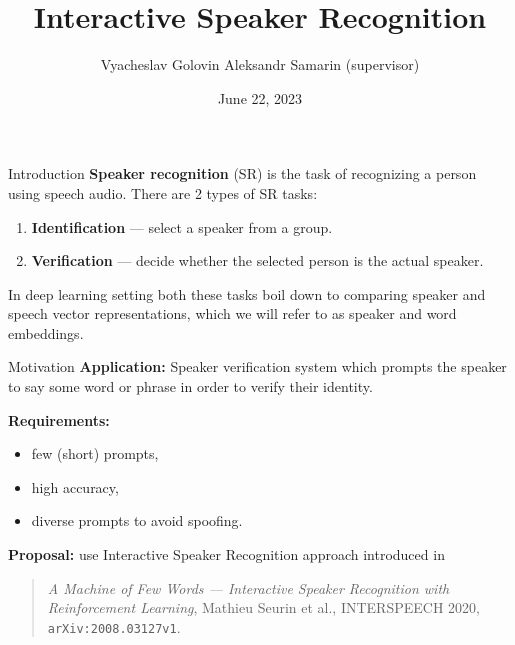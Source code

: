 \documentclass[11pt, aspectratio=169]{beamer}
\title{Interactive Speaker Recognition}
\author{Vyacheslav Golovin \texorpdfstring{\newline}{, }
    {\small Aleksandr Samarin (supervisor)}}
\institute[HSE]{Huawei CBG AI and HSE University}
\date{June 22, 2023}
\begin{document}
\maketitle

\begin{frame}{Introduction}
    \textbf{Speaker recognition} (SR) is the task of recognizing a person using
    speech audio. There are 2 types of SR tasks:
    \begin{enumerate}
        \item \textbf{Identification} --- select a speaker from a group.
        \item \textbf{Verification} --- decide whether the selected person
        is the actual speaker.
    \end{enumerate}

    In deep learning setting both these tasks boil down to comparing speaker
    and speech vector representations, which we will refer to as
    \alert{speaker} and \alert{word embeddings}.
\end{frame}

\begin{frame}{Motivation}
    \textbf{Application:} Speaker verification system which prompts the speaker
    to say some word or phrase in order to verify their identity.

    \textbf{Requirements:}
    \begin{itemize}
        \item few (short) prompts,
        \item high accuracy,
        \item diverse prompts to avoid spoofing.
    \end{itemize}

    \textbf{Proposal:} use Interactive Speaker Recognition approach introduced
    in \vspace{1em}

    \begin{quote}
        \normalfont{}
        \emph{A Machine of Few Words --- Interactive
        Speaker Recognition with Reinforcement Learning}, Mathieu Seurin et al.,
        INTERSPEECH 2020, \texttt{arXiv:2008.03127v1}.
    \end{quote}

\end{frame}
\end{document}
